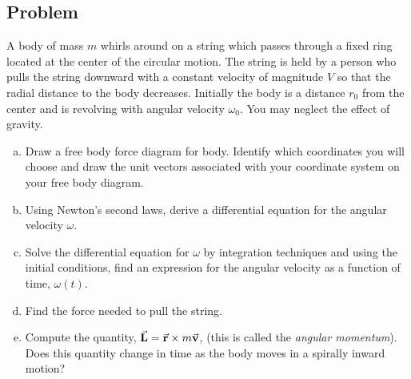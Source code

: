 \documentclass[solutions]{esg8012pset}
\begin{document}
\subsection*{Problem}
  A body of mass $m$ whirls around on a string which passes through a fixed ring located at the center of the circular motion. The string is held by a person who pulls the string downward with a constant velocity of magnitude $V$ so that the radial distance to the body decreases. Initially the body is a distance $r_0$ from the center and is revolving
with angular velocity $\omega_0$. You may neglect the effect of gravity.
  \begin{enumerate}[a)]
    \item Draw a free body force diagram for body. Identify which coordinates you will choose and draw the unit vectors associated with your coordinate system on your free body diagram.
    \item Using Newton's second laws, derive a differential equation for the angular velocity $\omega$.
    \item Solve the differential equation for $\omega$ by integration techniques and using the initial conditions, find an expression for the angular velocity as a function of time, $\omega(t)$.
    \item Find the force needed to pull the string.
    \item Compute the quantity, $\vec{\bf{L}} = \vec{\bf{r}}\times m\vec{\bf{v}}$, (this is called the \emph{angular momentum}). Does this quantity change in time as the body moves in a spirally inward motion?
  \end{enumerate}
\end{document}
